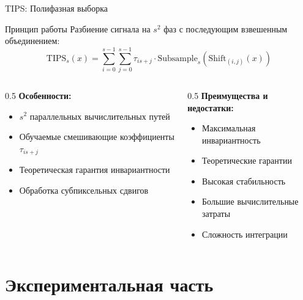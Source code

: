 \documentclass[aspectratio=169]{beamer}
\begin{document}
\begin{frame}{TIPS: Полифазная выборка}
    \begin{block}{Принцип работы}
        Разбиение сигнала на $s^2$ фаз с последующим взвешенным объединением:
        $$\text{TIPS}_s(x) = \sum_{i=0}^{s-1}\sum_{j=0}^{s-1} \tau_{is+j} \cdot \text{Subsample}_{s}(\text{Shift}_{(i,j)}(x))$$
    \end{block}
    
    \begin{columns}
        \begin{column}{0.5\textwidth}
            \textbf{Особенности:}
            \begin{itemize}
                \item $s^2$ параллельных вычислительных путей
                \item Обучаемые смешивающие коэффициенты $\tau_{is+j}$
                \item Теоретическая гарантия инвариантности
                \item Обработка субпиксельных сдвигов
            \end{itemize}
        \end{column}
        \begin{column}{0.5\textwidth}
            \textbf{Преимущества и недостатки:}
            \begin{itemize}
                \item[+] Максимальная инвариантность
                \item[+] Теоретические гарантии
                \item[+] Высокая стабильность
                \item[-] Большие вычислительные затраты
                \item[-] Сложность интеграции
            \end{itemize}
        \end{column}
    \end{columns}
\end{frame}

\section{Экспериментальная часть}
\end{document}
